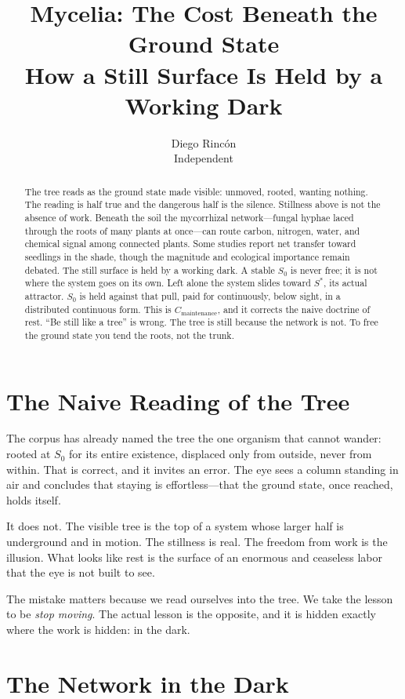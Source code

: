 \documentclass[12pt]{article}
\title{Mycelia: The Cost Beneath the Ground State\\
\large How a Still Surface Is Held by a Working Dark}
\author{Diego Rincón\\
\small Independent}
\date{}
\begin{document}
\maketitle

\begin{abstract}
The tree reads as the ground state made visible: unmoved, rooted, wanting nothing. The reading is half true and the dangerous half is the silence. Stillness above is not the absence of work. Beneath the soil the mycorrhizal network---fungal hyphae laced through the roots of many plants at once---can route carbon, nitrogen, water, and chemical signal among connected plants. Some studies report net transfer toward seedlings in the shade, though the magnitude and ecological importance remain debated. The still surface is held by a working dark. A stable $S_0$ is never free; it is not where the system goes on its own. Left alone the system slides toward $S^*$, its actual attractor. $S_0$ is held against that pull, paid for continuously, below sight, in a distributed continuous form. This is $C_{\text{maintenance}}$, and it corrects the naive doctrine of rest. ``Be still like a tree'' is wrong. The tree is still because the network is not. To free the ground state you tend the roots, not the trunk.
\end{abstract}

\section{The Naive Reading of the Tree}

The corpus has already named the tree the one organism that cannot wander: rooted at $S_0$ for its entire existence, displaced only from outside, never from within. That is correct, and it invites an error. The eye sees a column standing in air and concludes that staying is effortless---that the ground state, once reached, holds itself.

It does not. The visible tree is the top of a system whose larger half is underground and in motion. The stillness is real. The freedom from work is the illusion. What looks like rest is the surface of an enormous and ceaseless labor that the eye is not built to see.

The mistake matters because we read ourselves into the tree. We take the lesson to be \emph{stop moving}. The actual lesson is the opposite, and it is hidden exactly where the work is hidden: in the dark.

\section{The Network in the Dark}
\end{document}
